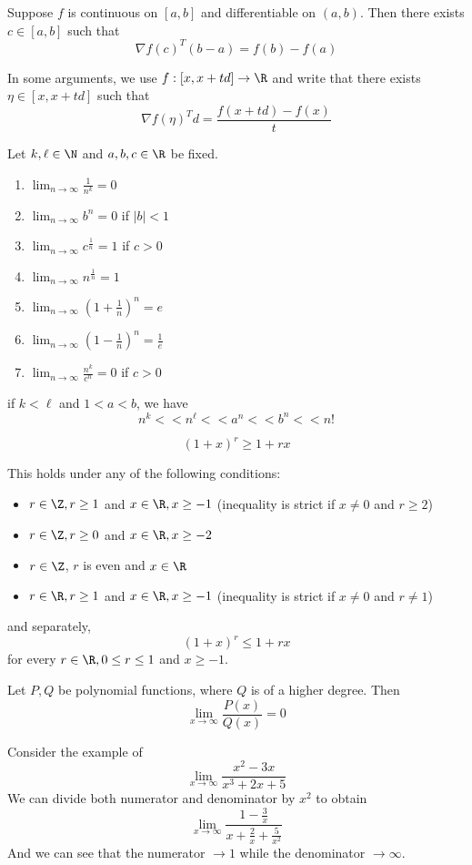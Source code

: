 Suppose $f$ is continuous on $[a,b]$ and differentiable on $(a,b)$.
Then there exists $c\in[a,b]$ such that
$$
	\nabla f(c)^T(b-a)=f(b)-f(a)
$$

In some arguments, we use $f:[x,x+td]\to\R$ and write that there
exists $\eta\in[x,x+td]$ such that
$$
	\nabla f(\eta)^Td=\frac{f(x+td)-f(x)}t
$$

\label{ffc8953}

Let $k,\ell\in\N$ and $a,b,c\in\R$ be fixed.
\begin{enumerate}[label=(\alph*)]
	\def\li{\displaystyle\lim_{n\to\infty}}
	\item $\li\frac1{n^k}=0$
	\item $\li b^n=0$ \quad if \quad $|b|<1$
	\item $\li c^{\frac1n}=1$ \quad if \quad $c>0$
	\item $\li n^{\frac1n}=1$
	\item $\li \left(1+\frac1n\right)^n=e$
	\item $\li \left(1-\frac1n\right)^n=\frac1e$
	\item $\li \frac{n^k}{c^n}=0$ \quad if \quad $c>0$
\end{enumerate}

if $k<\ell$ and $1<a<b$, we have
$$
	n^k << n^\ell << a^n << b^n << n!
$$

\label{d44713f}
$$
	(1+x)^r\geq 1+rx
$$

This holds under any of the following conditions:
\begin{itemize}
	\item $r\in\Z,r\geq1$ and $x\in\R,x\geq-1$ (inequality is strict if
	      $x\neq0$ and $r\geq2$)
	\item $r\in\Z,r\geq0$ and $x\in\R,x\geq-2$
	\item $r\in\Z$, $r$ is even and $x\in\R$
	\item $r\in\R,r\geq1$ and $x\in\R,x\geq-1$ (inequality is strict if
	      $x\neq0$ and $r\neq1$)
\end{itemize}

and separately,
$$
	(1+x)^r\leq 1+rx
$$
for every $r\in\R,0\leq r\leq 1$ and $x\geq-1$.


Let $P,Q$ be polynomial functions, where $Q$ is of a higher degree.
Then
$$
	\lim_{x\to\infty}\frac{P(x)}{Q(x)}=0
$$

\begin{compute}
	Consider the example of
	$$
		\lim_{x\to\infty}\frac{x^2 - 3x}{x^3 + 2x + 5}
	$$
	We can divide both numerator and denominator by $x^2$ to obtain
	$$
		\lim_{x\to\infty}\frac{1 - \frac3x}{x + \frac2x + \frac5{x^2}}
	$$
	And we can see that the numerator $\to1$ while the denominator
	$\to\infty$.
\end{compute}

